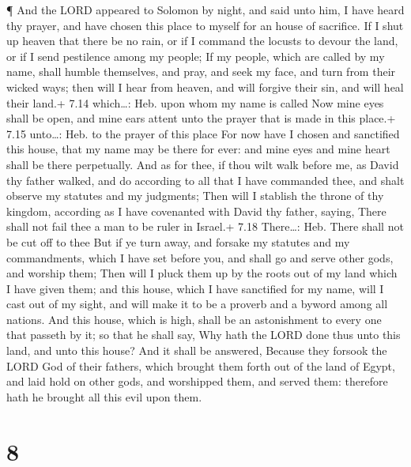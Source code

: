  ¶ And the LORD appeared to Solomon by night, and said unto
him, I have heard thy prayer, and have chosen this place to myself for
an house of sacrifice.  If I shut up heaven that there be
no rain, or if I command the locusts to devour the land, or if I send
pestilence among my people;  If my people, which are called
by my name, shall humble themselves, and pray, and seek my face, and
turn from their wicked ways; then will I hear from heaven, and will
forgive their sin, and will heal their land.+ 7.14 which\ldots: Heb.
upon whom my name is called  Now mine eyes shall be open,
and mine ears attent unto the prayer that is made in this place.+ 7.15
unto\ldots: Heb. to the prayer of this place  For now have
I chosen and sanctified this house, that my name may be there for ever:
and mine eyes and mine heart shall be there perpetually. 
And as for thee, if thou wilt walk before me, as David thy father
walked, and do according to all that I have commanded thee, and shalt
observe my statutes and my judgments;  Then will I stablish
the throne of thy kingdom, according as I have covenanted with David thy
father, saying, There shall not fail thee a man to be ruler in Israel.+
7.18 There\ldots: Heb. There shall not be cut off to thee 
But if ye turn away, and forsake my statutes and my commandments, which
I have set before you, and shall go and serve other gods, and worship
them;  Then will I pluck them up by the roots out of my
land which I have given them; and this house, which I have sanctified
for my name, will I cast out of my sight, and will make it to be a
proverb and a byword among all nations.  And this house,
which is high, shall be an astonishment to every one that passeth by it;
so that he shall say, Why hath the LORD done thus unto this land, and
unto this house?  And it shall be answered, Because they
forsook the LORD God of their fathers, which brought them forth out of
the land of Egypt, and laid hold on other gods, and worshipped them, and
served them: therefore hath he brought all this evil upon them.

\hypertarget{section-7}{%
\section{8}\label{section-7}}

